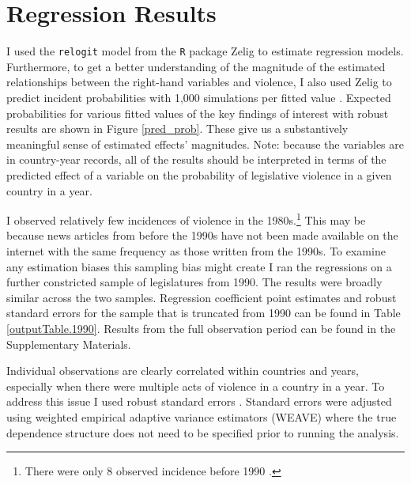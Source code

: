 \documentclass[a4paper]{article}\usepackage[]{graphicx}\usepackage[]{color}
\begin{document}
\section{Regression Results}

I used the {\tt{relogit}} model from the {\tt{R}} package Zelig \citep{IMAIKingZelig2008} to estimate regression models. Furthermore, to get a better understanding of the magnitude of the estimated relationships between the right-hand variables and violence, I also used Zelig to predict incident probabilities with 1,000 simulations per fitted value \citep[]{King2002}. Expected probabilities for various fitted values of the key findings of interest with robust results are shown in Figure \ref{pred_prob}. These give us a substantively meaningful sense of estimated effects' magnitudes. Note: because the variables are in country-year records, all of the results should be interpreted in terms of the predicted effect of a variable on the probability of legislative violence in a given country in a year.

I observed relatively few incidences of violence in the 1980s.\footnote{There were only 8 observed incidence before 1990 .} This may be because news articles from before the 1990s have not been made available on the internet with the same frequency as those written from the 1990s. To examine any estimation biases this sampling bias might create I ran the regressions on a further constricted sample of  legislatures from 1990. The results were broadly similar across the two samples. Regression coefficient point estimates and robust standard errors for the sample that is truncated from 1990 can be found in Table \ref{outputTable.1990}. Results from the full observation period can be found in the Supplementary Materials. 

Individual observations are clearly correlated within countries and years, especially when there were multiple acts of violence in a country in a year. To address this issue I used robust standard errors \citep{Golder2006, Mainwaring2007}. Standard errors were adjusted using \cite{Lumley1999} weighted empirical adaptive variance estimators (WEAVE) where the true dependence structure does not need to be specified prior to running the analysis.

\end{document}
